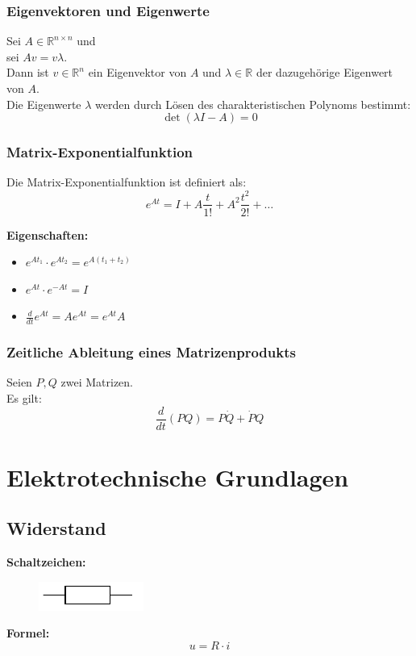 \documentclass[10pt,a4paper]{article}
\begin{document}
\subsubsection{Eigenvektoren und Eigenwerte}
Sei $A \in \mathbb{R}^{n \times n}$ und \\
sei $Av = v\lambda$. \\
Dann ist $v \in \mathbb{R}^n$ ein Eigenvektor von $A$ und $\lambda \in \mathbb{R}$ der dazugehörige Eigenwert von $A$. \\

Die Eigenwerte $\lambda$ werden durch Lösen des charakteristischen Polynoms bestimmt:
$$
	\det(\lambda I - A) = 0
$$

\subsubsection{Matrix-Exponentialfunktion}
Die Matrix-Exponentialfunktion ist definiert als:
$$
	e^{At} = I + A\frac{t}{1!} + A^2 \frac{t^2}{2!} + \dots
$$

\textbf{Eigenschaften:}
\begin{itemize}
	\item $e^{At_1} ⋅ e^{At_2} = e^{A(t_1 + t_2)}$
	\item $e^{At} ⋅ e^{-At} = I$
	\item $\frac{d}{dt} e^{At} = Ae^{At} = e^{At}A$
\end{itemize}

\subsubsection{Zeitliche Ableitung eines Matrizenprodukts}
Seien $P,Q$ zwei Matrizen. \\
Es gilt:
$$
	\frac{d}{dt}(PQ) = P \dot Q + \dot P Q
$$

\section{Elektrotechnische Grundlagen}
\subsection{Widerstand}
\textbf{Schaltzeichen:} \\
\begin{figure}[H]
	\includegraphics[width=0.15\columnwidth]{imgs/widerstand.pdf}
\end{figure}
\textbf{Formel:}
$$
	u = R ⋅ i
$$
\end{document}
